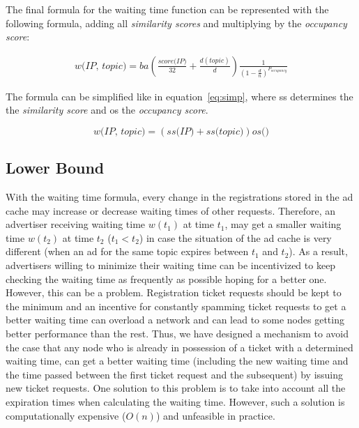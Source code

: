 The final formula for the waiting time function can be represented with  the following formula,  adding all \emph{similarity scores} and multiplying by the \emph{occupancy score}:

\begin{equation}
\begin{split}
    \textit{w(IP, topic)} = 
    ba(\frac{\textit{score(IP)}}{32} +
    \frac{d(topic)}{d})
    \frac{1}{(1-\frac{d}{n})^{P_{occupancy}}}
\end{split}
\end{equation}

The formula can be simplified like in equation~\ref{eq:simp}, where ss determines the the \emph{similarity score} and os the \emph{occupancy score}.

\begin{equation}
\label{eq:simp}
    \textit{w(IP, topic)} = 
    (\textit{ss(IP)} + 
    \textit{ss(topic)})
    \textit{os()}
\end{equation}

\subsection{Lower Bound}
With the waiting time formula, every change in the registrations stored in  the ad cache may increase or decrease waiting times of other requests. 
Therefore,  an advertiser receiving waiting time $w(t_1)$ at time $t_1$, may get a smaller waiting time $w(t_2)$ at time $t_2$ ($t_1 < t_2$) in case the situation of the ad cache is very different (\eg when an ad for the same topic expires between $t_1$ and $t_2$). 
As a result,  advertisers willing to minimize their waiting time can be incentivized to keep checking the waiting time as frequently as possible hoping for a better one.
However, this can be a problem. 
Registration ticket requests should be kept to the minimum and an incentive for constantly spamming ticket requests to get a better waiting time can overload a network and can lead to some nodes getting better performance than the rest.
Thus, we have designed a mechanism to avoid the case that any node who is already in possession of a ticket with a determined waiting time, can get a better waiting time (including the new waiting time and the time passed between the first ticket request and the subsequent) by issuing new ticket requests.
One solution to this problem is to take into account all the expiration times when calculating the waiting time. 
However, such a solution is computationally expensive (\eg $O(n)$) and unfeasible in practice.

